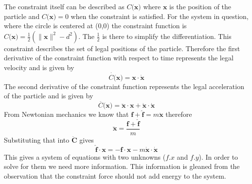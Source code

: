 The constraint itself can be described as $C(\mathbf{x)}$ where $\mathbf{x}$ is
the position of the particle and $C(\mathbf{x)} = 0$ when the constraint is
satisfied. For the system in question, where the circle is centered at (0,0) the
constraint function is $C(\mathbf{x)} = \frac{1}{2}(\|\mathbf{x}\|^2 - d^2)$.
The $\frac{1}{2}$ is there to simplify the differentiation. This constraint describes 
the set of legal positions of the particle. Therefore the first derivative of
the constraint function with respect to time represents the legal velocity and is given by
\begin{equation}
    \label{Eqn:LegalVelocity}
    \dot{C(}\mathbf{x})=\mathbf{x}\cdot\dot{\mathbf{x}}
\end{equation}
The second derivative of the constraint function represents the legal
acceleration of the particle and is given by
\begin{equation}
    \label{Eqn:LegalAcceleration}
    \ddot{C(}\mathbf{x})=\ddot{\mathbf{x}}\cdot{\mathbf{x}} + 
    \dot{\mathbf{x}}\cdot\dot{\mathbf{x}}
\end{equation}
From Newtonian mechanics we know that
$\mathbf{f + \hat{f}} = m\mathbf{\ddot{x}}$ therefore
\[\mathbf{\ddot{x}} = \frac{\mathbf{f + \hat{f}}}{m}\] 
Substituting that into $\mathbf{\ddot{C}}$ gives
\begin{equation}
    \label{Eqn:ConstraintForce}
    \hat{\mathbf{f}}\cdot\mathbf{x} = 
    -\mathbf{f}\cdot\mathbf{x} - 
    m\dot{\mathbf{x}}\cdot\dot{\mathbf{x}}
\end{equation}
This gives a system of equations with two unknowns ($f.x$ and $f.y$). In order
to solve for them we need more information. This information is gleaned from the
observation that the constraint force should not add energy to the system.

